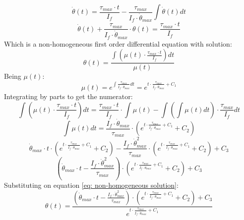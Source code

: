     \[\dot{\theta}(t) = \frac{\tau_{max}\cdot t}{I_f} - \frac{\tau_{max}}{I_f \cdot \dot{\theta}_{max}}\int \dot{\theta}(t) dt \]
    \[\dot{\theta}(t) + \frac{\tau_{max}}{I_f \cdot \dot{\theta}_{max}}\cdot \theta(t) = \frac{\tau_{max}\cdot t}{I_f} \]
    Which is a non-homogeneous first order differential equation with solution:
    \begin{equation}
        \label{eq: non-homogeneous solution}
        \theta(t) = \frac{\int(\mu(t) \cdot \frac{\tau_{max}\cdot t}{I_f})dt}{\mu(t)}
    \end{equation}
    Being $\mu(t)$:    
    \begin{equation*}
        \mu(t) = e^{\int \frac{\tau_{max}}{I_f \cdot \dot{\theta}_{max}} dt} = e^{t\cdot \frac{\tau_{max}}{I_f \cdot \dot{\theta}_{max}}+C_1}
    \end{equation*}
    Integrating by parts to get the numerator:
    \begin{equation*}
        \int(\mu(t) \cdot \frac{\tau_{max}\cdot t}{I_f})dt = \frac{\tau_{max}\cdot t}{I_f}\cdot\int\mu(t) - \int (\int \mu(t) dt) \cdot \frac{\tau_{max}}{I_f}dt
    \end{equation*}
    \begin{equation*}
        \int \mu(t) dt = \frac{I_f \cdot \dot{\theta}_{max}}{\tau_{max}} \cdot (e^{t\cdot \frac{\tau_{max}}{I_f \cdot \dot{\theta}_{max}}+C_1}+C_2)
    \end{equation*}
    \begin{equation*}
        \dot{\theta}_{max} \cdot t\cdot (e^{t\cdot \frac{\tau_{max}}{I_f \cdot \dot{\theta}_{max}}+C_1}+C_2) - \frac{I_f \cdot \dot{\theta}_{max}^2}{\tau_{max}} \cdot (e^{t\cdot \frac{\tau_{max}}{I_f \cdot \dot{\theta}_{max}}+C_1}+C_2) +C_3
    \end{equation*}
    \begin{equation*}
        (\dot{\theta}_{max} \cdot t- \frac{I_f \cdot \dot{\theta}_{max}^2}{\tau_{max}})\cdot (e^{t\cdot \frac{\tau_{max}}{I_f \cdot \dot{\theta}_{max}}+C_1}+C_2)+C_3 
    \end{equation*}
    Substituting on equation \ref{eq: non-homogeneous solution}:
    \begin{equation*}
        \theta(t) = \frac{(\dot{\theta}_{max} \cdot t- \frac{I_f \cdot \dot{\theta}_{max}^2}{\tau_{max}})\cdot (e^{t\cdot \frac{\tau_{max}}{I_f \cdot \dot{\theta}_{max}}+C_1}+C_2)+C_3 }
        {e^{t\cdot \frac{\tau_{max}}{I_f \cdot \dot{\theta}_{max}}+C_1}}
    \end{equation*}


